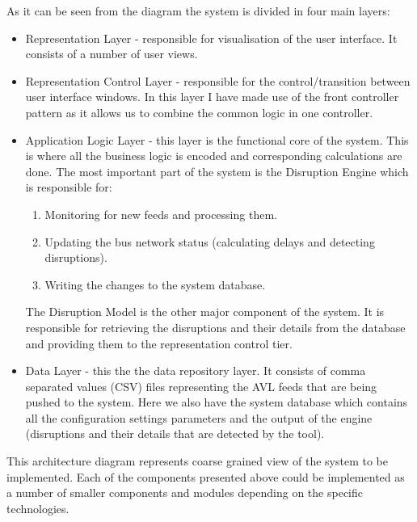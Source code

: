 As it can be seen from the diagram the system is divided in four main layers:
\begin{itemize}
	\item Representation Layer - responsible for visualisation of the user interface. It consists of a number of user views.
	\item Representation  Control Layer - responsible for the control/transition between user interface windows. In this layer I have made use of the front controller pattern \cite{fowler2003patterns} as it allows us to combine the common logic in one controller.
	\item Application Logic Layer -  this layer is the functional core of the system. This is where all the business logic is encoded and corresponding calculations are done. The most important part of the system is the Disruption Engine which is responsible for:
	\begin{enumerate}
		\item Monitoring for new feeds and processing them.
		\item Updating the bus network status (calculating delays and detecting disruptions).
		\item Writing the changes to the system database.
	\end{enumerate}
	The Disruption Model is the other major component of the system. It is responsible for retrieving the disruptions and their details from the database and providing them to the representation control tier.
	\item Data Layer - this the the data repository layer. It consists of comma separated values (CSV) files representing the AVL feeds that are being pushed to the system. Here we also have the system database which contains all the configuration settings parameters and the output of the engine (disruptions and their details that are detected by the tool).
\end{itemize}
This architecture diagram represents coarse grained view of the system to be implemented. Each of the components presented above could be implemented as a number of smaller components and modules depending on the specific technologies.

\FloatBarrier
